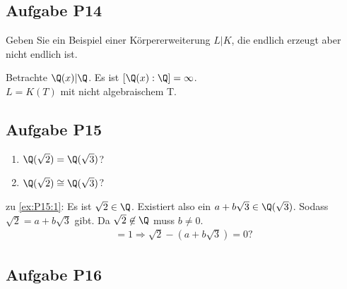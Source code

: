 
\subsection*{Aufgabe P14}
Geben Sie ein Beispiel einer Körpererweiterung $L\vert K$, die endlich erzeugt aber nicht endlich ist.

\begin{lösung}
	Betrachte $\Q(x)\vert \Q$. Es ist $[\Q(x):\Q] = \infty$.\\
	$L = K(T)$ mit nicht algebraischem T.
\end{lösung}


\subsection*{Aufgabe P15} %
\begin{enumerate}
	\item $\Q(\sqrt{2}) = \Q(\sqrt{3})$? \label{ex:P15:1}
	\item $\Q(\sqrt{2}) \cong \Q(\sqrt{3})$? \label{ex:P15:2}
\end{enumerate}

\begin{lösung}
	zu \ref{ex:P15:1}: Es ist $\sqrt{2} \in \Q$. Existiert also ein $a+b\sqrt{3} \in \Q(\sqrt{3})$. Sodass $\sqrt{2} = a + b\sqrt{3}$ gibt. Da $\sqrt{2} \not\in \Q$ muss $b \neq 0$.
	\begin{align*}
		[\Q(\sqrt{2}):\Q(\sqrt{3})] = 1 \Rightarrow \sqrt{2} - (a+b\sqrt{3}) = 0\text{?}
	\end{align*}
\end{lösung}


\subsection*{Aufgabe P16} %

%

